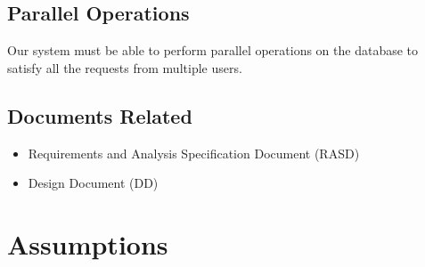 \documentclass{report}
\begin{document}
		\subsection{Parallel Operations}
		Our system must be able to perform parallel operations on the database to satisfy all the requests from multiple users.

		\subsection{Documents Related}

			\begin{itemize}
				\item Requirements and Analysis Specification Document (RASD)

				\item Design Document (DD)
			\end{itemize}

	\section{Assumptions}
\end{document}
